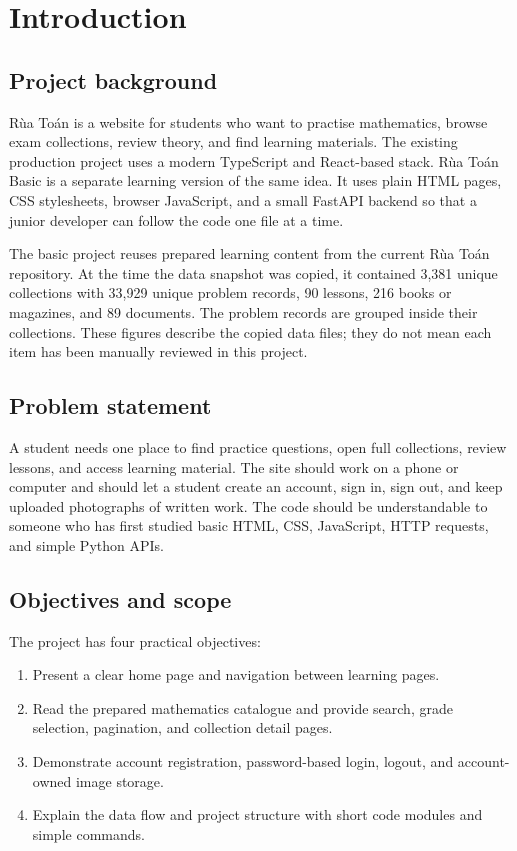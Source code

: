 \section{Introduction}
\subsection{Project background}
Rùa Toán is a website for students who want to practise mathematics, browse exam collections, review theory, and find learning materials. The existing production project uses a modern TypeScript and React-based stack. Rùa Toán Basic is a separate learning version of the same idea. It uses plain HTML pages, CSS stylesheets, browser JavaScript, and a small FastAPI backend so that a junior developer can follow the code one file at a time.

The basic project reuses prepared learning content from the current Rùa Toán repository. At the time the data snapshot was copied, it contained 3,381 unique collections with 33,929 unique problem records, 90 lessons, 216 books or magazines, and 89 documents. The problem records are grouped inside their collections. These figures describe the copied data files; they do not mean each item has been manually reviewed in this project.

\subsection{Problem statement}
A student needs one place to find practice questions, open full collections, review lessons, and access learning material. The site should work on a phone or computer and should let a student create an account, sign in, sign out, and keep uploaded photographs of written work. The code should be understandable to someone who has first studied basic HTML, CSS, JavaScript, HTTP requests, and simple Python APIs.

\subsection{Objectives and scope}
The project has four practical objectives:
\begin{enumerate}
  \item Present a clear home page and navigation between learning pages.
  \item Read the prepared mathematics catalogue and provide search, grade selection, pagination, and collection detail pages.
  \item Demonstrate account registration, password-based login, logout, and account-owned image storage.
  \item Explain the data flow and project structure with short code modules and simple commands.
\end{enumerate}

